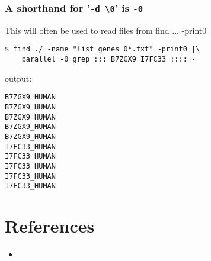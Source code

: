 \documentclass{article}
\begin{document}
\subsubsection{A shorthand for '\texttt{-d  \textbackslash{}0}' is \texttt{-0}}
This will often be used to read files from find ... -print0
\begin{lstlisting}
$ find ./ -name "list_genes_0*.txt" -print0 |\
	parallel -0 grep ::: B7ZGX9 I7FC33 :::: -
\end{lstlisting}
output:
\begin{lstlisting}
B7ZGX9_HUMAN
B7ZGX9_HUMAN
B7ZGX9_HUMAN
B7ZGX9_HUMAN
B7ZGX9_HUMAN
I7FC33_HUMAN
I7FC33_HUMAN
I7FC33_HUMAN
I7FC33_HUMAN
I7FC33_HUMAN
\end{lstlisting}

\section{References}
\begin{itemize}
\item{}
\end{itemize}
\end{document}
